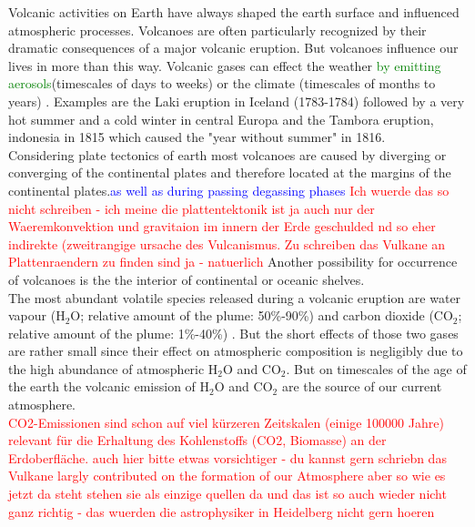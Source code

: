 
Volcanic activities on Earth have always shaped the earth surface and influenced atmospheric processes. Volcanoes are often particularly recognized by their dramatic consequences of a major volcanic eruption. But volcanoes influence our lives in more than this way. Volcanic gases can effect the weather \textcolor{green}{by emitting aerosols}(timescales of days to weeks) or the climate (timescales of months to years) \cite{schmidt2015volcanismarticle}.
Examples are the Laki eruption in Iceland (1783-1784) followed by a very hot summer and a cold winter in central Europa \cite{thordarson2003atmospheric} and the Tambora eruption, indonesia in 1815 which caused the "year without summer" in 1816.\\
%
\newline
%
Considering plate tectonics of earth  most volcanoes are caused by diverging or converging of the continental plates and therefore located at the margins of the continental plates.\textcolor{blue}{as well as during passing degassing phases}
\textcolor{red}{Ich wuerde das so nicht schreiben - ich meine die plattentektonik ist ja auch nur der Waeremkonvektion und gravitaion im innern der Erde geschulded nd so eher indirekte (zweitrangige ursache des Vulcanismus. Zu schreiben das Vulkane an Plattenraendern zu finden sind ja - natuerlich }
Another possibility for occurrence of volcanoes is the the interior of continental or oceanic shelves. \cite{schmincke2000vulkanismus}\\
The most abundant volatile species released during a volcanic eruption are water vapour (H$_2$O; relative amount of the plume: 50\%-90\%) and carbon dioxide (CO$_2$; relative amount of the plume: 1\%-40\%) \cite{platt2015quantification}. But the short effects of those two gases are rather small since their effect on atmospheric composition is negligibly due to the high abundance of atmospheric H$_2$O and CO$_2$. But on timescales of the age of the earth the volcanic emission of H$_2$O and CO$_2$ are the source of our current atmosphere. \cite{schmidt2015volcanism}\\ 
\textcolor{red}{CO2-Emissionen sind schon auf viel kürzeren Zeitskalen (einige 100000 Jahre) relevant für die Erhaltung des Kohlenstoffs (CO2, Biomasse) an der Erdoberfläche.}
\textcolor{red}{auch hier bitte etwas vorsichtiger - du kannst gern schriebn das Vulkane largly contributed on the formation of our Atmosphere	aber so wie es jetzt da steht stehen sie als einzige quellen da und das ist so auch wieder nicht ganz richtig - das wuerden die astrophysiker in Heidelberg nicht gern hoeren}
